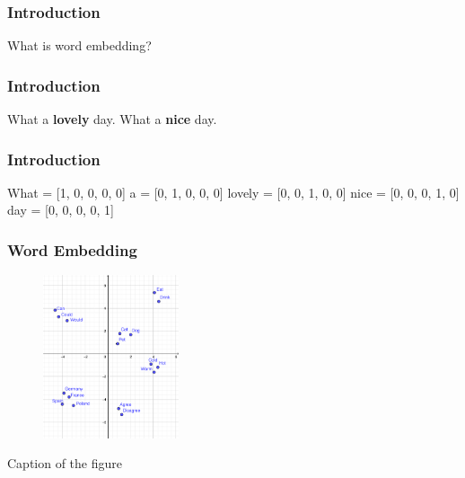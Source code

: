 \begin{frame}
	\frametitle{Introduction}
	
	\begin{center}
		\Huge {What is word embedding?}
	\end{center}
\end{frame}



\begin{frame}
	\frametitle{Introduction}
	
	
		\huge {What a \textbf{lovely} day.}
		 \newline
		\huge{What a \textbf{nice} day.}

\end{frame}

\begin{frame}
	\frametitle{Introduction}
	
	
		\huge {What = [1, 0, 0, 0, 0]}
		 \newline
		\huge{a = [0, 1, 0, 0, 0]}
		\newline
		\huge{lovely = [0, 0, 1, 0, 0]}
		\newline
		\huge{nice = [0, 0, 0, 1, 0]}
		\newline
		\huge{day = [0, 0, 0, 0, 1]}

\end{frame}

\begin{frame}
	\frametitle{Word Embedding}

	\begin{figure}
		\includegraphics[width=4cm]{./figures/Groups}

	\end{figure}
		\begin{center}
		{Caption of the figure}
		\end{center}
	\vspace{-0.5cm}



\end{frame}


